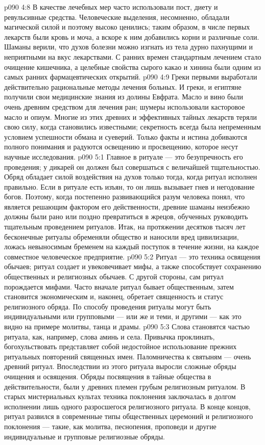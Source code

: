 \vs p090 4:8 В качестве лечебных мер часто использовали пост, диету и ревульсивные средства. Человеческие выделения, несомненно, обладали магической силой и поэтому высоко ценились; таким образом, в числе первых лекарств были кровь и моча, а вскоре к ним добавились корни и различные соли. Шаманы верили, что духов болезни можно изгнать из тела дурно пахнущими и неприятными на вкус лекарствами. С ранних времен стандартным лечением стало очищение кишечника, а целебные свойства сырого какао и хинина были одним из самых ранних фармацевтических открытий.
\vs p090 4:9 Греки первыми выработали действительно рациональные методы лечения больных. И греки, и египтяне получили свои медицинские знания из долины Евфрата. Масло и вино были очень древним средством для лечения ран; шумеры использовали касторовое масло и опиум. Многие из этих древних и эффективных тайных лекарств теряли свою силу, когда становились известными; секретность всегда была непременным условием успешности обмана и суеверий. Только факты и истина добиваются полного понимания и радуются освещению и просвещению, которое несут научные исследования.
\vs p090 5:1 Главное в ритуале --- это безупречность его проведения; у дикарей он должен был совершаться с величайшей тщательностью. Обряд обладает силой воздействия на духов только тогда, когда ритуал исполнен правильно. Если в ритуале есть изъян, то он лишь вызывает гнев и негодование богов. Поэтому, когда постепенно развивающийся разум человека понял, что  является решающим фактором его действенности, древние шаманы неизбежно должны были рано или поздно превратиться в жрецов, обученных руководить тщательным проведением ритуалов. Итак, на протяжении десятков тысяч лет бесконечные ритуалы обременяли общество и наносили вред цивилизации, ложась невыносимым бременем на каждый поступок в течение жизни, на каждое совместное человеческое предприятие.
\vs p090 5:2 Ритуал --- это техника освящения обычаев; ритуал создает и увековечивает мифы, а также способствует сохранению общественных и религиозных обычаев. С другой стороны, сам ритуал порождается мифами. Часто вначале ритуал бывает общественным, затем становится экономическим и, наконец, обретает священность и статус религиозного обряда. По способу проведения ритуалы могут быть индивидуальными или групповыми --- или же и теми, и другими --- как это видно на примере молитвы, танца и драмы.
\vs p090 5:3 Слова становятся частью ритуала, как, например, слова аминь и села. Привычка проклинать, богохульствовать представляет собой недостойное использование прежних ритуальных повторений священных имен. Паломничества к святыням --- очень древний ритуал. Впоследствии из этого ритуала выросли сложные обряды очищения и освящения. Обряды посвящения в тайные общества в действительности, были у древних племен грубым религиозным ритуалом. В старых мистериальных культах техника поклонения заключалась в долгом исполнении лишь одного разросшегося религиозного ритуала. В конце концов, ритуал развился в современные типы общественных церемоний и религиозного поклонения --- такие, как молитва, песнопения, проповеди и другие индивидуальные и групповые религиозные обряды.
